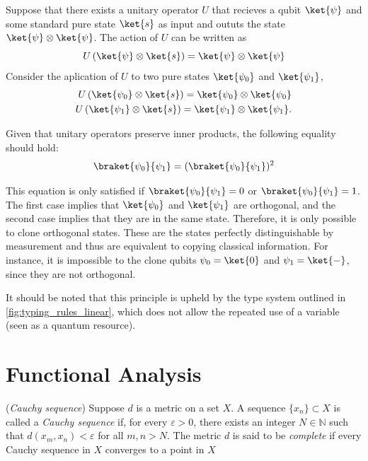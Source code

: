 Suppose that there exists a unitary operator $U$ that recieves a qubit $\ket{\psi}$ and some standard pure state $\ket{s}$ as input and oututs the state $\ket{\psi} \otimes \ket{\psi}$. The action of $U$ can be written as
\begin{equation*}
  U \left(\ket{\psi} \otimes \ket{s} \right) = \ket{\psi} \otimes \ket{\psi}
\end{equation*}
Consider the aplication of $U$ to two pure states $\ket{\psi_0}$ and $\ket{\psi_1}$,
\begin{align*}
  U \left(\ket{\psi_0} \otimes \ket{s} \right) = \ket{\psi_0} \otimes \ket{\psi_0} \\
  U \left(\ket{\psi_1} \otimes \ket{s} \right) = \ket{\psi_1} \otimes \ket{\psi_1}.
\end{align*}

Given that unitary operators preserve inner products, the following equality should hold:
\begin{equation*}
  \braket{\psi_0}{\psi_1} = ( \braket{\psi_0}{\psi_1})^{2}
\end{equation*}

This equation is only satisfied if $\braket{\psi_0}{\psi_1} = 0$ or $\braket{\psi_0}{\psi_1} = 1$. The first case implies that $\ket{\psi_0}$ and $\ket{\psi_1}$ are orthogonal, and the second case implies that they are in the same state. Therefore, it is only possible to clone orthogonal states. These are the states perfectly distinguishable by measurement and thus are equivalent to copying classical information. For instance, it is impossible to the clone qubits $\psi_0 = \ket{0}$ and $\psi_1 = \ket{-}$, since they are not orthogonal.

It should be noted that this principle is upheld by the type system outlined in \autoref{fig:typing_rules_linear}, which does not allow the repeated use of a variable (seen as a quantum resource).



\section{Functional Analysis} \label{sec:funal}

\begin{definition} (\emph{Cauchy sequence})
  Suppose $ d $ is a metric on a set $ X $. A sequence $ \{x_n\} \subset X $ is called a \emph{Cauchy sequence} if, for every $ \varepsilon > 0 $, there exists an integer $N \in \mathbb{N} $ such that $ d(x_m, x_n) < \varepsilon $ for all $ m, n > N $.  The metric \( d \) is said to be \emph{complete} if every Cauchy sequence in \( X \) converges to a point in \( X \)
\end{definition}

